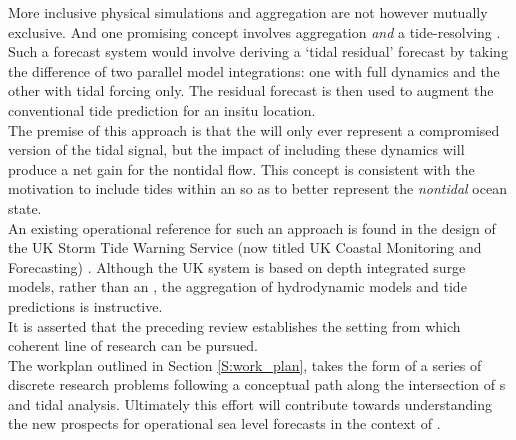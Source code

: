 More inclusive physical simulations and aggregation are not however mutually exclusive.  And one promising concept involves aggregation \emph{and} a tide-resolving \OGCM{}.\\
Such a forecast system would involve deriving a `tidal residual' forecast by taking the difference of two parallel model integrations: one with full dynamics and the other with tidal forcing only.  The residual forecast is then used to augment the conventional tide prediction for an insitu location.\\
The premise of this approach is that the \OGCM{} will only ever represent a compromised version of the tidal signal, but the impact of including these dynamics will produce a net gain for the nontidal flow.  This concept is consistent with the motivation to include tides within an \OGCM{} so as to better represent the \emph{nontidal} ocean state. \\

An existing operational reference for such an approach is found in the design of the UK Storm Tide Warning Service (now titled UK Coastal Monitoring and Forecasting) \cite{Horsburg:2009ui}.   Although the UK system is based on depth integrated surge models, rather than an \OGCM{}, the aggregation of hydrodynamic models and tide predictions is instructive.\\   




It is asserted that the preceding review establishes the setting from which coherent line of research can be pursued. \\
The workplan outlined in Section \ref{S:work_plan}, takes the form of a series of discrete research problems following a conceptual path along the intersection of \OGCM{}s and tidal analysis.    Ultimately this effort will contribute towards understanding the new prospects for operational sea level forecasts in the context of \BL{}.




